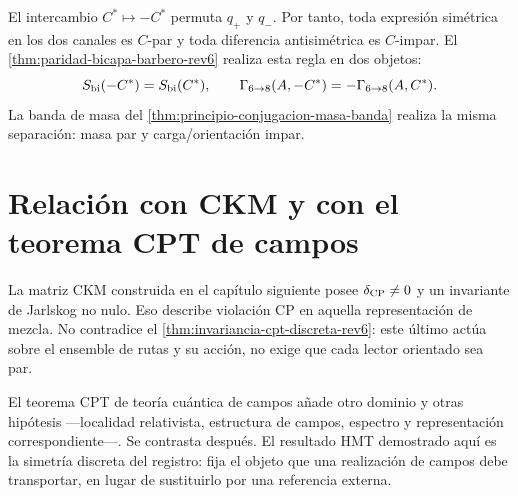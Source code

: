 El intercambio \(C^*\mapsto-C^*\) permuta \(q_+\) y \(q_-\). Por tanto,
toda expresión simétrica en los dos canales es \(C\)-par y toda diferencia
antisimétrica es \(C\)-impar. El
\cref{thm:paridad-bicapa-barbero-rev6} realiza esta regla en dos objetos:
\[
 S_{\rm bi}(-C^*)=S_{\rm bi}(C^*),
 \qquad
 \Gamma_{6\to8}(A,-C^*)
 =-\Gamma_{6\to8}(A,C^*).
\]
La banda de masa del
\cref{thm:principio-conjugacion-masa-banda} realiza la misma separación:
masa par y carga/orientación impar.

\section{Relación con CKM y con el teorema CPT de campos}

La matriz CKM construida en el capítulo siguiente posee
\(\delta_{\rm CP}\neq0\) y un invariante de Jarlskog no nulo. Eso describe
violación CP en aquella representación de mezcla. No contradice el
\cref{thm:invariancia-cpt-discreta-rev6}: este último actúa sobre el
ensemble de rutas y su acción, no exige que cada lector orientado sea par.

El teorema CPT de teoría cuántica de campos añade otro dominio y otras
hipótesis ---localidad relativista, estructura de campos, espectro y
representación correspondiente---. Se contrasta después. El resultado HMT
demostrado aquí es la simetría discreta del registro: fija el objeto que una
realización de campos debe transportar, en lugar de sustituirlo por una
referencia externa.
